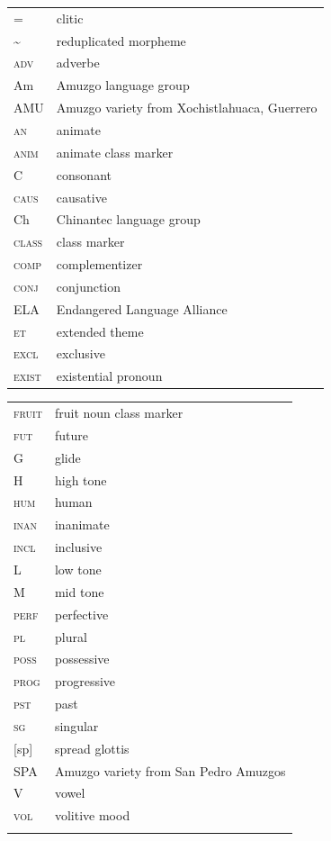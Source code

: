 \documentclass[output=paper]{langscibook}
\begin{document}
\begin{tabularx}{.45\textwidth}{lQ}
= &  clitic\\
{\textasciitilde} &  reduplicated morpheme\\
\textsc{adv} &  adverbe\\
Am & Amuzgo language group\\
AMU & Amuzgo variety from Xochistlahuaca, Guerrero\\
\textsc{an} &  animate \\
\textsc{anim} &  animate class marker\\
C & consonant\\
\textsc{caus} &  causative\\
Ch & Chinantec language group \\
\textsc{class} &  class marker\\
\textsc{comp} &  complementizer\\
\textsc{conj} &  conjunction\\
ELA & Endangered Language Alliance\\
\textsc{et} &  extended theme\\
\textsc{excl} &  exclusive\\
\textsc{exist} &  existential pronoun\\
\end{tabularx}
\begin{tabularx}{.45\textwidth}{lQ}
\textsc{fruit} &  fruit noun class marker\\
\textsc{fut} &  future\\
G & glide\\
H & high tone\\
\textsc{hum} &  human\\
\textsc{inan} &  inanimate\\
\textsc{incl} &  inclusive\\
L & low tone\\
M & mid tone\\
\textsc{perf} &  perfective\\
\textsc{pl} &  plural\\
\textsc{poss} &  possessive\\
\textsc{prog} &  progressive\\
\textsc{pst} &  past\\
\textsc{sg} &  singular\\
{}[sp] & spread glottis\\
SPA & Amuzgo variety from San Pedro Amuzgos\\
V & vowel\\
\textsc{vol} &  volitive mood\\
\\
\end{tabularx}
\end{document}
